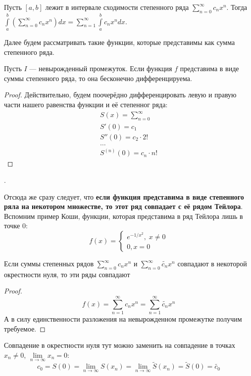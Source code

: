 \documentclass[a4paper, 12pt]{article}
\begin{document}
\begin{Consequence}
    Пусть $[a,b]$ лежит в интервале сходимости степенного ряда $\sum\limits_{n = 0}^{\infty}c_n x^n$. Тогда $\int\limits_a^b\left(\sum\limits_{n = 0}^{\infty}c_n x^n\right)dx = \sum\limits_{n= 1}^{\infty} \int\limits_a^bc_n x^ndx$.
\end{Consequence}
Далее будем рассматривать такие функции, которые представимы как сумма степенного ряда.
\begin{Statement}
    Пусть $I$ --- невырожденный промежуток. Если функция $f$ представима в виде суммы степенного ряда, то она бесконечно дифференцируема.
\end{Statement}
\begin{proof}
    Действительно, будем поочерёдно дифференцировать левую и правую части нашего равенства функции и её степенног ряда:
    \begin{gather*}
        S(x) = \sum\limits_{n = 0}^{\infty}\\
        S'(0) = c_1\\
        S''(0) = c_2\cdot 2!\\
        \ldots\\
        S^{(n)}(0) = c_n \cdot n!
    \end{gather*}
\end{proof}.
\par Отсюда же сразу следует, что \textbf{если функция представима в виде степенного ряла на некотором множестве, то этот ряд совпадает с её рядом Тейлора}.
Вспомним пример Коши, функции, которая представима в ряд Тейлора лишь в точке 0:
\[
    f(x) = 
    \begin{cases*}
        e^{-1/x^2}, \; x \neq 0\\
        0, x = 0
    \end{cases*}
\]
\begin{Consequence}
    Если суммы степенных рядов $\sum\limits_{n=0}^{\infty}c_n x^n$ и $\sum\limits_{n=0}^{\infty}\widetilde{c_n} x^n$ совпадают в некоторой окрестности нуля, то эти ряды совпадают  
\end{Consequence}
\begin{proof}
    \[
        f(x) = \sum\limits_{n=1}^{\infty} c_n x^n = \sum\limits_{n=1}^{\infty} \widetilde{c_n} x^n
    \]
    А в силу единственности разложения на невырожденном промежутке получим требуемое.
\end{proof}
\begin{Comment}
    Совпадение в окрестности нуля тут можно заменить на совпадение в точках $x_n \neq 0$, $\lim\limits_{n\to \infty} x_n = 0$:
    \[
        c_0 = S(0) = \lim\limits_{n \to \infty} S(x_n) = \lim\limits_{n \to \infty} \widetilde{S}(x_n) = \widetilde{S}(0) = \widetilde{c_0}
    \]
\end{Comment}
\end{document}
